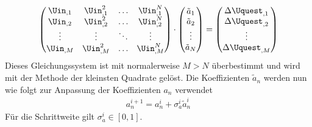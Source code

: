 \documentclass[../Report.tex]{subfiles}
\begin{document}
\begin{align}
	\left( 
	\begin{matrix}
	 	\Uin_{,1} & \Uin_{,1}^2 & \dots & \Uin_{,1}^N \\
		\Uin_{,2} & \Uin_{,2}^2 & \dots & \Uin_{,2}^N \\
		\vdots & \vdots & \ddots & \vdots \\
		\Uin_{,M} & \Uin_{,M}^2 & \dots & \Uin_{,M}^N \\
	\end{matrix}
	\right)
	\cdot
	\left(
	\begin{matrix}
		\tilde{a}_1 \\
		\tilde{a}_2 \\
		\vdots \\
		\tilde{a}_N \\	 
	\end{matrix}
	\right) = \left( 
	\begin{matrix}
		\Delta \Uquest_{,1} \\
		\Delta \Uquest_{,2} \\
		\vdots \\
		\Delta \Uquest_{,M} \\	 
	\end{matrix}
	\right)
	\label{eq:Uquest.Gleichungssystem}
\end{align}
Dieses Gleichungssystem ist mit normalerweise $M>N$ überbestimmt und wird mit der Methode der kleinsten Quadrate gelöst. Die Koeffizienten $\tilde{a}_n$ werden nun wie folgt zur Anpassung der Koeffizienten $a_n$ verwendet
\begin{align}
	\label{eq:opt.adjusta}
	a_n^{i+1} = a_n^{i} + \sigma_{a}^{i} \tilde{a}_n^{i}
\end{align}
Für die Schrittweite gilt $\sigma_{a}^i \in \left[ 0 , 1 \right]$.
\end{document}
